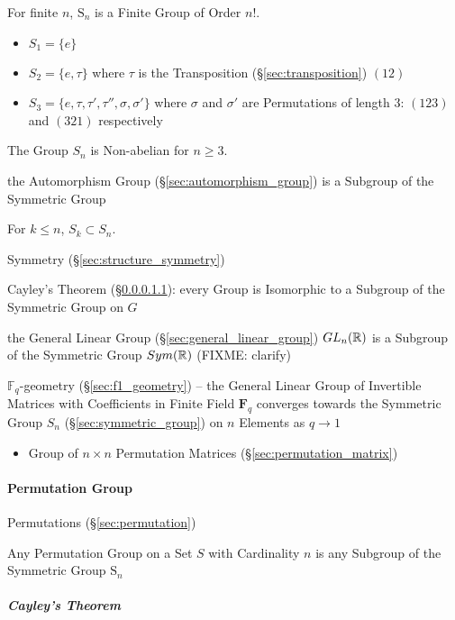 For finite $n$, $\mathrm{S}_n$ is a Finite Group of Order $n!$.

\begin{itemize}
    \item $S_1 = \{e\}$
    \item $S_2 = \{e,\tau\}$ where $\tau$ is the Transposition
      (\S\ref{sec:transposition}) $(12)$
    \item $S_3 = \{e, \tau, \tau', \tau'', \sigma, \sigma'\}$ where $\sigma$ and
      $\sigma'$ are Permutations of length 3: $(123)$ and $(321)$ respectively
\end{itemize}
The Group $S_n$ is Non-abelian for $n \geq 3$.

the Automorphism Group (\S\ref{sec:automorphism_group}) is a Subgroup of the
Symmetric Group %

For $k \leq n$, $S_k \subset S_n$.

Symmetry (\S\ref{sec:structure_symmetry})

Cayley's Theorem (\S\ref{sec:cayleys_theorem}): every Group is Isomorphic to a
Subgroup of the Symmetric Group on $G$

\fist the General Linear Group (\S\ref{sec:general_linear_group}) $GL_n(\mathbb{R})$
is a Subgroup of the Symmetric Group $Sym(\mathbb{R})$ (FIXME: clarify)

\fist $\mathbb{F}_q$-geometry (\S\ref{sec:f1_geometry}) -- the General Linear
Group of Invertible Matrices with Coefficients in Finite Field $\mathbf{F}_q$
converges towards the Symmetric Group $S_n$ (\S\ref{sec:symmetric_group}) on $n$
Elements as $q \rightarrow 1$

\begin{itemize}
  \item Group of $n \times n$ Permutation Matrices
    (\S\ref{sec:permutation_matrix})
\end{itemize}



\paragraph{Permutation Group}\label{sec:permutation_group}\hfill

Permutations (\S\ref{sec:permutation})

Any Permutation Group on a Set $S$ with Cardinality $n$ is any Subgroup of the
Symmetric Group $\mathrm{S}_n$



\subparagraph{Cayley's Theorem}\label{sec:cayleys_theorem}\hfill

